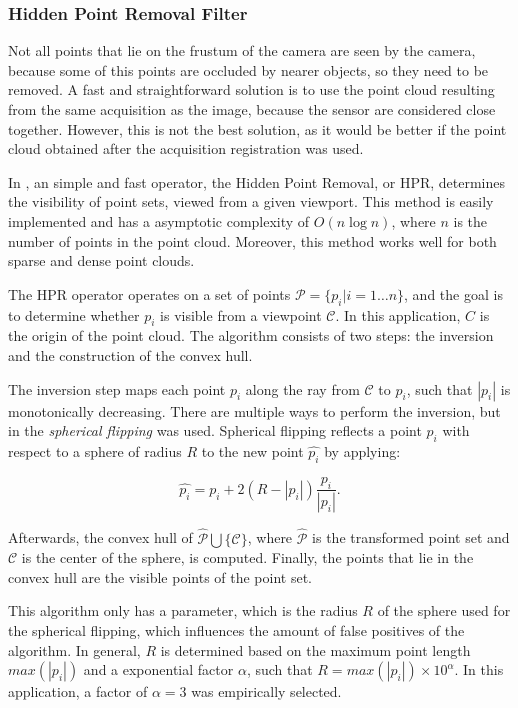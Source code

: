 \subsubsection{Hidden Point Removal Filter}

Not all points that lie on the frustum of the camera are seen by the camera, because some of this points are occluded by nearer objects, so they need to be removed. A fast and straightforward solution is to use the point cloud resulting from the same acquisition as the image, because the sensor are considered close together. However, this is not the best solution, as it would be better if the point cloud obtained after the acquisition registration was used.

In \cite{katz07}, an simple and fast operator, the Hidden Point Removal, or HPR, determines the visibility of point sets, viewed from a given viewport. This method is easily implemented and has a asymptotic complexity of $O(n \log n)$, where $n$ is the number of points in the point cloud. Moreover, this method works well for both sparse and dense point clouds.

The HPR operator operates on a set of points $\mathcal{P} = \{p_i | i = 1 \dots n \}$, and the goal is to determine whether $p_i$ is visible from a viewpoint $\mathcal{C}$. In this application, $C$ is the origin of the point cloud. The algorithm consists of two steps: the inversion and the construction of the convex hull.

The inversion step maps each point $p_i$ along the ray from $\mathcal{C}$ to $p_i$, such that $|p_i|$ is monotonically decreasing. There are multiple ways to perform the inversion, but in \cite{katz07} the \emph{spherical flipping} was used. Spherical flipping reflects a point $p_i$ with respect to a sphere of radius $R$ to the new point $\hat{p_i}$ by applying:

\begin{equation}
    \label{eqn:spherical-flipping}
    \hat{p_i} = p_i + 2 (R - |p_i|) \frac{p_i}{|p_i|}.
\end{equation}

Afterwards, the convex hull of $\hat{\mathcal{P}} \bigcup \{\mathcal{C}\}$, where $\hat{\mathcal{P}}$ is the transformed point set and $\mathcal{C}$ is the center of the sphere, is computed. Finally, the points that lie in the convex hull are the visible points of the point set.

This algorithm only has a parameter, which is the radius $R$ of the sphere used for the spherical flipping, which influences the amount of false positives of the algorithm. In general, $R$ is determined based on the maximum point length $max(|p_i|)$ and a exponential factor $\alpha$, such that $R = max(|p_i|) \times 10^{\alpha}$. In this application, a factor of $\alpha = 3$ was empirically selected.

